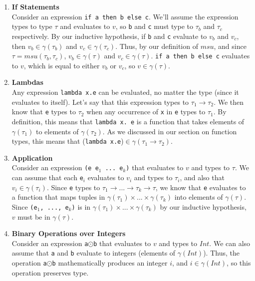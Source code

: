 \documentclass[12pt]{article}
\begin{document}
\begin{enumerate}
\item \textbf{If Statements}\\
Consider an expression \texttt{if a then b else c}. We'll assume the expression types to type $\tau$ and evaluates to $v$, so \texttt{b} and \texttt{c} must type to $\tau_b$ and $\tau_c$ respectively. By our inductive hypothesis, if \texttt{b} and \texttt{c} evaluate to $v_b$ and $v_c$, then $v_b\in\gamma(\tau_b)$ and $v_c\in\gamma(\tau_c)$. Thus, by our definition of $msu$, and since $\tau = msu(\tau_b, \tau_c)$, $v_b\in\gamma(\tau)$ and $v_c\in\gamma(\tau)$. \texttt{if a then b else c} evaluates to $v$, which is equal to either $v_b$ or $v_c$, so $v\in\gamma(\tau)$.

\item \textbf{Lambdas}\\
Any expression \texttt{lambda x.\hspace{0.05in}e} can be evaluated, no matter the type (since it evaluates to itself). Let's say that this expression types to $\tau_1\rightarrow\tau_2$. We then know that \texttt{e} types to $\tau_2$ when any occurrence of \texttt{x} in \texttt{e} types to $\tau_1$. By definition, this means that \texttt{lambda x.\ e} is a function that takes elements of $\gamma(\tau_1)$ to elements of $\gamma(\tau_2)$. As we discussed in our section on function types, this means that (\texttt{lambda x.\hspace{0.05in}e})$\in\gamma(\tau_1\rightarrow\tau_2)$.

\item \textbf{Application}\\
Consider an expression \texttt{(e e$_1$ ... e$_k$)} that evaluates to $v$ and types to $\tau$. We can assume that each \texttt{e$_i$} evaluates to $v_i$ and types to $\tau_i$, and also that $v_i\in\gamma(\tau_i)$. Since \texttt{e} types to $\tau_1\rightarrow ... \rightarrow \tau_k \rightarrow \tau$, we know that \texttt{e} evaluates to a function that maps tuples in $\gamma(\tau_1)\times ... \times\gamma(\tau_k)$ into elements of $\gamma(\tau)$. Since \texttt{(e$_1$, ..., e$_k$)} is in $\gamma(\tau_1)\times ... \times\gamma(\tau_k)$ by our inductive hypothesis, $v$ must be in $\gamma(\tau)$.

\item \textbf{Binary Operations over Integers}\\
Consider an expression \texttt{a$\odot$b} that evaluates to $v$ and types to $Int$. We can also assume that \texttt{a} and \texttt{b} evaluate to integers (elements of $\gamma(Int)$). Thus, the operation \texttt{a$\odot$b} mathematically produces an integer $i$, and $i\in\gamma(Int)$, so this operation preserves type.


\end{enumerate}
\end{document}

